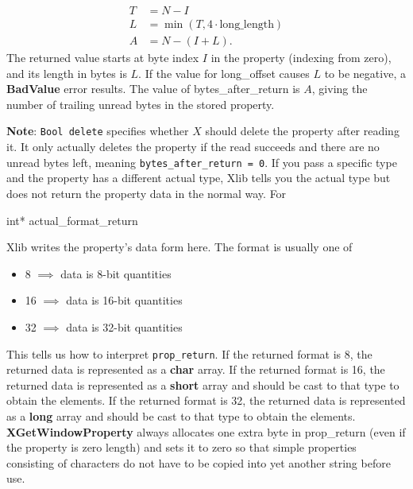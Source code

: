 \documentclass{report}
\begin{document}
\begin{itemize}
\begin{itemize}
\begin{align*}
                    T &= N - I \\
                    L &= \min(T, 4\cdot \text{long\_length}) \\
                    A &= N - (I+L)
                .\end{align*}
                The returned value starts at byte index $I$ in the property (indexing from zero), and its length in bytes is $L$. If the value for long\_offset causes $L$ to be negative, a \textbf{BadValue} error results. The value of bytes\_after\_return is $A$, giving the number of trailing unread bytes in the stored property.
        \end{itemize}
        \textbf{Note}: \texttt{Bool delete} specifies whether $X$ should delete the property after reading it. It only actually deletes the property if the read succeeds and there are no unread bytes left, meaning \texttt{bytes\_after\_return = 0}.
        \bigbreak \noindent 
        If you pass a specific type and the property has a different actual type, Xlib tells you the actual type but does not return the property data in the normal way.
        \bigbreak \noindent 
        For 
        \bigbreak \noindent 
        \begin{cppcode}
        int* actual_format_return
        \end{cppcode}
        \bigbreak \noindent 
        Xlib writes the property's data form here. The format is usually one of
        \begin{itemize}
            \item 8 $\implies $ data is 8-bit quantities
            \item 16 $\implies$ data is 16-bit quantities
            \item 32 $\implies$ data is 32-bit quantities
        \end{itemize}
        This tells us how to interpret \texttt{prop\_return}.
        \bigbreak \noindent 
        If the returned format is 8, the returned data is represented as a \textbf{char} array. If the returned format is 16, the returned data is represented as a \textbf{short} array and should be cast to that type to obtain the elements. If the returned format is 32, the returned data is represented as a \textbf{long} array and should be cast to that type to obtain the elements.
        \bigbreak \noindent 
        \textbf{XGetWindowProperty} always allocates one extra byte in prop\_return (even if the property is zero length) and sets it to zero so that simple properties consisting of characters do not have to be copied into yet another string before use.

\end{itemize}
\end{document}
